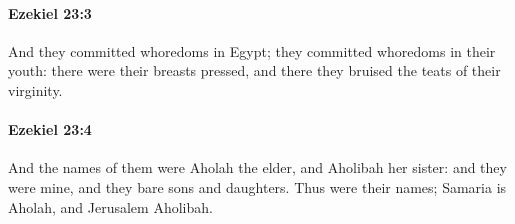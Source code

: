 		\paragraph{Ezekiel 23:3} %
			\label{EZEKIEL-23-3}

			And they committed whoredoms in Egypt; they committed whoredoms in their youth: there were their breasts pressed, and there they bruised the teats of their virginity.


		\paragraph{Ezekiel 23:4} %
			\label{EZEKIEL-23-4}

			And the names of them were Aholah the elder, and Aholibah her sister: and they were mine, and they bare sons and daughters. Thus were their names; Samaria is Aholah, and Jerusalem Aholibah.


